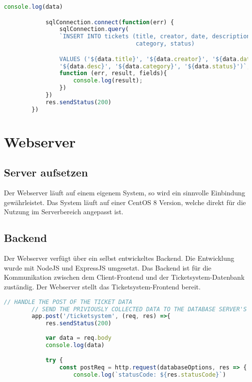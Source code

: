 \documentclass{scrartcl}
\begin{document}
\begin{flushleft}
\begin{lstlisting}[language=JavaScript, caption={Datenbank API-Endpunkt: Ticket in Datenbank aufnehmen}, captionpos=t]
            console.log(data)

            sqlConnection.connect(function(err) {        
                sqlConnection.query(
                `INSERT INTO tickets (title, creator, date, description,
                                      category, status) 

                VALUES ('${data.title}', '${data.creator}', '${data.date}', 
                '${data.desc}', '${data.category}', '${data.status}')`, 
                function (err, result, fields){
                    console.log(result);
                })
            })
            res.sendStatus(200)
        })\end{lstlisting}

    \newpage

    \section{Webserver}
    \subsection{Server aufsetzen}
    Der Webserver läuft auf einem eigenem System, so wird ein sinnvolle Einbindung gewährleistet. Das System läuft auf einer CentOS 8 Version, welche direkt für die Nutzung im Serverbereich angepasst ist. 
    
    \subsection{Backend}
    Der Webserver verfügt über ein selbst entwickeltes Backend. Die Entwicklung wurde mit NodeJS und ExpressJS umgesetzt. Das Backend ist für die Kommunikation zwischen dem Client-Frontend und der Ticketsystem-Datenbank zuständig. Der Webserver stellt das Ticketsystem-Frontend bereit.

    \begin{lstlisting}[language=JavaScript, caption={Webserver API-Endpunkt: Ticket in Datenbank aufnehmen}, captionpos=t]
        // HANDLE THE POST OF THE TICKET DATA
        // SEND THE PRIVIOUSLY COLLECTED DATA TO THE DATABASE SERVER'S API
        app.post('/ticketsystem', (req, res) =>{
            res.sendStatus(200)  
            
            var data = req.body
            console.log(data)

            try {
                const postReq = http.request(databaseOptions, res => {
                    console.log(`statusCode: ${res.statusCode}`)


\end{lstlisting}
\end{flushleft}
\end{document}
